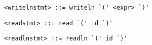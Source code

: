 \begin{footnotesize}
\begin{lstlisting}[frame=single, label={writelnstmt}, language=pie]
<writelnstmt> ::= writeln `(' <expr> `)'
\end{lstlisting}

\begin{lstlisting}[frame=single, label={readstmt}, language=pie]
<readstmt> ::= read `(' id `)'
\end{lstlisting}

\begin{lstlisting}[frame=single, label={readlnstmt}, language=pie]
<readlnstmt> ::= readln `(' id `)'
\end{lstlisting}
\end{footnotesize}